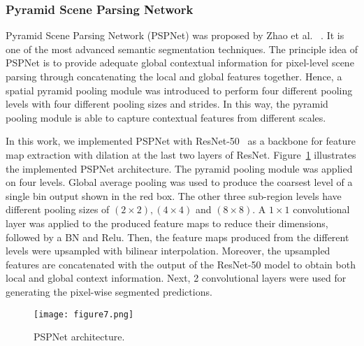 \subsubsection{Pyramid Scene Parsing Network}
Pyramid Scene Parsing Network (PSPNet) was proposed by Zhao et al.~\cite{zhao2017pyramid} .
It is one of the most advanced semantic segmentation techniques. 
The principle idea of PSPNet is to provide adequate global contextual information for pixel-level scene parsing through concatenating the local and global features together. 
Hence, a spatial pyramid pooling module was introduced to perform four different pooling levels with four different pooling sizes and strides.
In this way, the pyramid pooling module is able to capture contextual features from different scales.

In this work, we implemented PSPNet with ResNet-50~\cite{He2016} as a backbone for feature map extraction with dilation at the last two layers of ResNet. 
Figure~\ref{fig:PSPNet} illustrates the implemented PSPNet architecture.
The pyramid pooling module was applied on four levels.
Global average pooling was used to produce the coarsest level of a single bin output shown in the red box. 
The other three sub-region levels have different pooling sizes of \((2\times 2), (4\times 4)\) and \((8\times8)\).
A \(1 \times 1\) convolutional layer was applied to the produced feature maps to reduce their dimensions, followed by a BN and Relu.
Then, the feature maps produced from the different levels were upsampled with bilinear interpolation.
Moreover, the upsampled features are concatenated with the output of the ResNet-50 model to obtain both local and global context information. 
Next, 2 convolutional layers were used for generating the pixel-wise segmented predictions. 
\begin{figure} [h!]
	\centering
	\texttt{[image: figure7.png]}
	\caption{PSPNet architecture.} 
	\label{fig:PSPNet}
\end{figure} 
